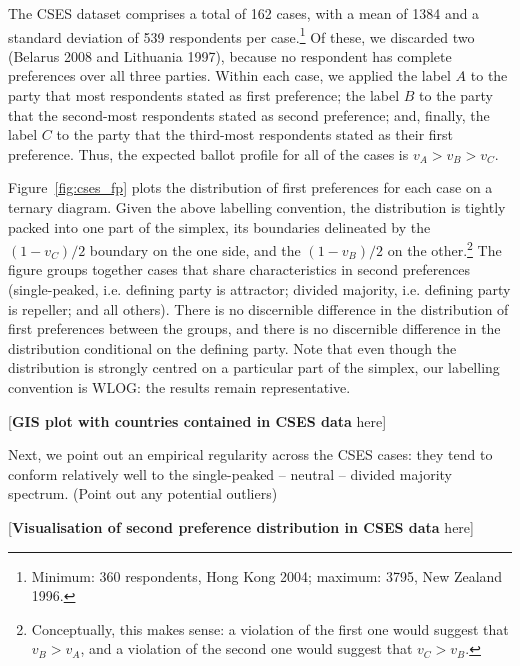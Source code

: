 \documentclass[12pt, letter, margin = 1.5 in]{article}
\begin{document}
The CSES dataset comprises a total of 162 cases, with a mean of 1384 and a standard deviation of 539 respondents per case.\footnote{Minimum: 360 respondents, Hong Kong 2004; maximum: 3795, New Zealand 1996.} Of these, we discarded two (Belarus 2008 and Lithuania 1997), because no respondent has complete preferences over all three parties. Within each case, we applied the label $A$ to the party that most respondents stated as first preference; the label $B$ to the party that the second-most respondents stated as second preference; and, finally, the label $C$ to the party that the third-most respondents stated as their first preference. Thus, the expected ballot profile for all of the cases is $v_A > v_B > v_C$. 

Figure~\ref{fig:cses_fp} plots the distribution of first preferences for each case on a ternary diagram. Given the above labelling convention, the distribution is tightly packed into one part of the simplex, its boundaries delineated by the $(1 - v_C) / 2$ boundary on the one side, and the $(1 - v_B) / 2$ on the other.\footnote{Conceptually, this makes sense: a violation of the first one would suggest that $v_B > v_A$, and a violation of the second one would suggest that $v_C > v_B$.} The figure groups together cases that share characteristics in second preferences (single-peaked, i.e. defining party is attractor; divided majority, i.e. defining party is repeller; and all others). There is no discernible difference in the distribution of first preferences between the groups, and there is no discernible difference in the distribution conditional on the defining party. Note that even though the distribution is strongly centred on a particular part of the simplex, our labelling convention is WLOG: the results remain representative.

\vspace*{2em}
\begin{center}
[\textbf{GIS plot with countries contained in CSES data} here]
\end{center}
\vspace*{2em}

Next, we point out an empirical regularity across the CSES cases: they tend to conform relatively well to the single-peaked -- neutral -- divided majority spectrum. (Point out any potential outliers)

\vspace*{2em}
\begin{center}
[\textbf{Visualisation of second preference distribution in CSES data} here]
\end{center}
\vspace*{2em}
\end{document}
